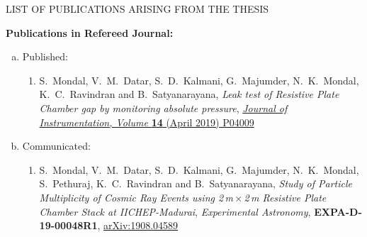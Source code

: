 \newpage

\begin{center}
  \large
  \uppercase{List of Publications arising from the thesis}
\end{center}

\normalsize

\noindent\textbf{Publications in Refereed Journal:}
\begin{enumerate}[a.]
\item Published:
  \begin{enumerate}[1)]
  \item S.~Mondal, V.~M.~Datar, S.~D.~Kalmani, G.~Majumder, N.~K.~Mondal, K.~C.~Ravindran and B.~Satyanarayana, \emph{Leak test of Resistive Plate Chamber gap by monitoring absolute pressure}, \href{https://doi.org/10.1088/1748-0221/14/04/P04009}{\emph{Journal of Instrumentation, Volume } \textbf{14} (April 2019) P04009}
  \end{enumerate}
\item Communicated:
  \begin{enumerate}[1)]
  \item S.~Mondal, V.~M.~Datar, S.~D.~Kalmani, G.~Majumder, N.~K.~Mondal, S.~Pethuraj, K.~C.~Ravindran and B.~Satyanarayana, \emph{Study of Particle Multiplicity of Cosmic Ray Events using 2\,m\,$\times$\,2\,m Resistive Plate Chamber Stack at IICHEP-Madurai}, \emph{Experimental Astronomy}, \textbf{EXPA-D-19-00048R1}, \href{https://arxiv.org/abs/1908.04589}{arXiv:1908.04589}
  \end{enumerate}
\end{enumerate}

